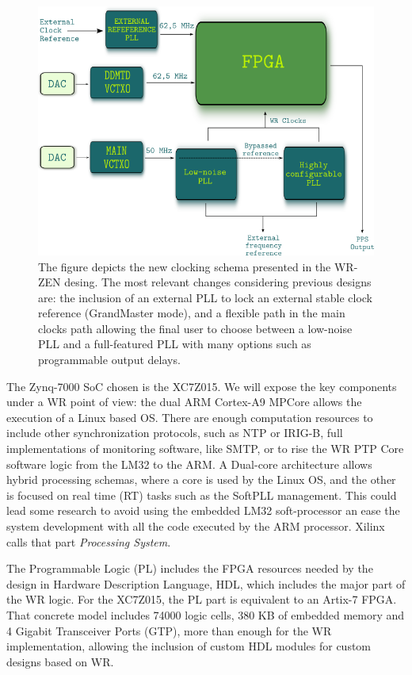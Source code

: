 \begin{figure}
	\centering
	\includegraphics[width=0.7\linewidth]{img/zenclkschema}
	\caption[WR-ZEN clocking schema]{The figure depicts the new clocking schema 
	presented in the WR-ZEN desing. The most relevant changes considering 
	previous designs are: the inclusion of an external PLL to lock an external 
	stable clock reference (GrandMaster mode), and a flexible path in the main 
	clocks path allowing the final user to choose between a low-noise PLL and a 
	full-featured PLL with many options such as programmable output delays.}
	\label{fig:zenclkschema}
\end{figure}

The Zynq-7000 SoC chosen is the XC7Z015. We will expose the 
key components under a WR point of view: the dual ARM Cortex-A9 MPCore allows the execution of a Linux based OS. There are enough computation resources to include other synchronization protocols, such as NTP or IRIG-B, full implementations of monitoring software, like SMTP, or to rise the WR PTP Core software logic from the LM32 to the ARM. A Dual-core architecture allows hybrid processing schemas, where a core is used by the Linux OS, and the other is focused on real time (RT) tasks such as the SoftPLL management. This could lead 
some research to avoid using the embedded LM32 soft-processor an ease the system development with all the code executed by the ARM processor. Xilinx calls that part \textit{Processing System}.

The Programmable Logic (PL) includes the FPGA resources needed 
by the design in Hardware Description Language, HDL, which includes the major part of the WR logic. For the XC7Z015, the PL part is equivalent to an Artix-7 FPGA. That concrete model includes 74000 logic cells, 380 KB of embedded memory and 4 Gigabit Transceiver Ports (GTP), more than enough for the WR implementation, allowing the inclusion of custom HDL modules for custom designs based on WR.

